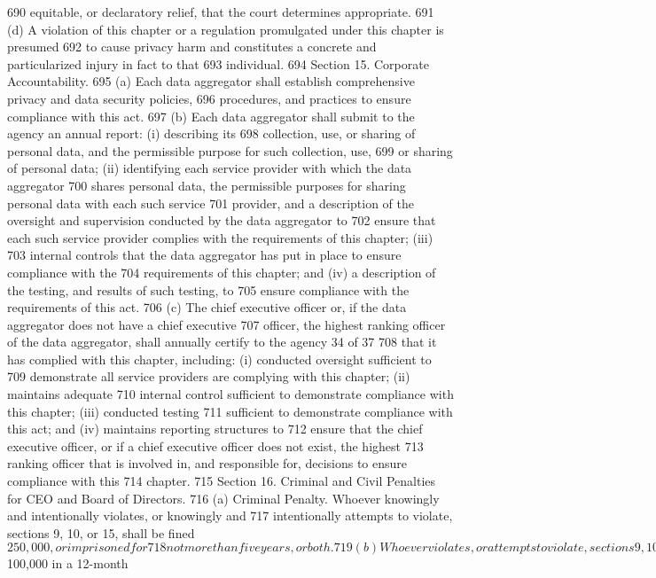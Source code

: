 690 equitable, or declaratory relief, that the court determines appropriate.
691 (d) A violation of this chapter or a regulation promulgated under this chapter is presumed
692 to cause privacy harm and constitutes a concrete and particularized injury in fact to that
693 individual.
694 Section 15. Corporate Accountability.
695 (a) Each data aggregator shall establish comprehensive privacy and data security policies,
696 procedures, and practices to ensure compliance with this act.
697 (b) Each data aggregator shall submit to the agency an annual report: (i) describing its
698 collection, use, or sharing of personal data, and the permissible purpose for such collection, use,
699 or sharing of personal data; (ii) identifying each service provider with which the data aggregator
700 shares personal data, the permissible purposes for sharing personal data with each such service
701 provider, and a description of the oversight and supervision conducted by the data aggregator to
702 ensure that each such service provider complies with the requirements of this chapter; (iii)
703 internal controls that the data aggregator has put in place to ensure compliance with the
704 requirements of this chapter; and (iv) a description of the testing, and results of such testing, to
705 ensure compliance with the requirements of this act.
706 (c) The chief executive officer or, if the data aggregator does not have a chief executive
707 officer, the highest ranking officer of the data aggregator, shall annually certify to the agency
34 of 37
708 that it has complied with this chapter, including: (i) conducted oversight sufficient to
709 demonstrate all service providers are complying with this chapter; (ii) maintains adequate
710 internal control sufficient to demonstrate compliance with this chapter; (iii) conducted testing
711 sufficient to demonstrate compliance with this act; and (iv) maintains reporting structures to
712 ensure that the chief executive officer, or if a chief executive officer does not exist, the highest
713 ranking officer that is involved in, and responsible for, decisions to ensure compliance with this
714 chapter.
715 Section 16. Criminal and Civil Penalties for CEO and Board of Directors.
716 (a) Criminal Penalty. Whoever knowingly and intentionally violates, or knowingly and
717 intentionally attempts to violate, sections 9, 10, or 15, shall be fined $250,000, or imprisoned for
718 not more than five years, or both.
719 (b) Whoever violates, or attempts to violate, sections 9, 10, or 15 while violating another
720 law or as part of a pattern of any illegal activity involving more than $100,000 in a 12-month
